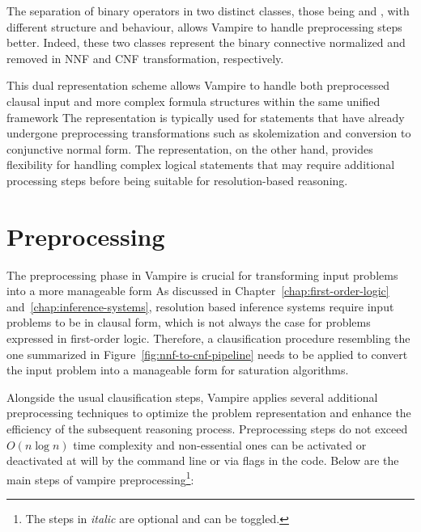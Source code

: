 The separation of binary operators in two distinct classes, those being  and , with different structure and behaviour, allows Vampire to handle preprocessing steps better.
Indeed, these two classes represent the binary connective normalized and removed in NNF and CNF transformation, respectively.

This dual representation scheme allows Vampire to handle both preprocessed clausal input and more complex formula structures within the same unified framework
The  representation is typically used for statements that have already undergone preprocessing transformations such as skolemization and conversion to conjunctive normal form.
The  representation, on the other hand, provides flexibility for handling complex logical statements that may require additional processing steps before being suitable for resolution-based reasoning.

\section{Preprocessing}\label{sec:preprocessing}

The preprocessing phase in Vampire is crucial for transforming input problems into a more manageable form
As discussed in Chapter~\ref{chap:first-order-logic} and~\ref{chap:inference-systems}, resolution based inference systems require input problems to be in clausal form, which is not always the case for problems expressed in first-order logic.
Therefore, a clausification procedure resembling the one summarized in Figure~\ref{fig:nnf-to-cnf-pipeline} needs to be applied to convert the input problem into a manageable form for saturation algorithms.

Alongside the usual clausification steps, Vampire applies several additional preprocessing techniques to optimize the problem representation and enhance the efficiency of the subsequent reasoning process.
Preprocessing steps do not exceed \(O(n\log{n})\) time complexity and non-essential ones can be activated or deactivated at will by the command line or via flags in the code.
Below are the main steps of vampire preprocessing\footnote{The steps in \emph{italic} are optional and can be toggled.}:

